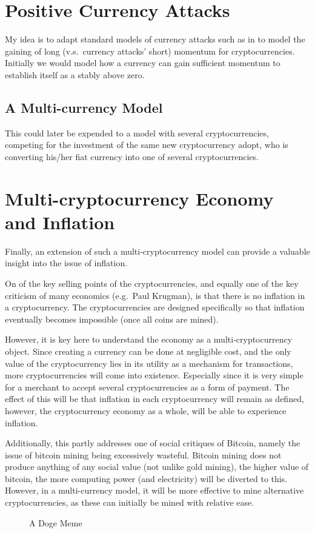 \begin{refsection}
\section{Positive Currency Attacks}
My idea is to adapt standard models of currency attacks such as in 
\textcite{obstfeld1986rational,obstfeld1995logic,obstfeld1996models}
to model the gaining of long (v.s.~currency attacks' short) momentum for cryptocurrencies.
Initially we would model how a currency can gain sufficient momentum to establish itself as a stably above zero.

\subsection{A Multi-currency Model}
This could later be expended to a model with several cryptocurrencies,
competing for the investment of the same new cryptocurrency adopt,
who is converting his/her fiat currency into one of several cryptocurrencies.

\section{Multi-cryptocurrency Economy and Inflation}
Finally, an extension of such a multi-cryptocurrency model can provide a valuable insight into the issue of inflation.

On of the key selling points of the cryptocurrencies, and equally one of the key criticism of many economics
(e.g.~Paul Krugman), is that there is no inflation in a cryptocurrency.
The cryptocurrencies are designed specifically so that inflation eventually becomes impossible (once all coins are mined).

However, it is key here to understand the economy as a multi-cryptocurrency object.
Since creating a currency can be done at negligible cost,
and the only value of the cryptocurrency lies in its utility as a mechanism for transactions,
more cryptocurrencies will come into existence.
Especially since it is very simple for a merchant to accept several cryptocurrencies as a form of payment.
The effect of this will be that inflation in each cryptocurrency will remain as defined,
however, the cryptocurrency economy as a whole, will be able to experience inflation.

Additionally, this partly addresses one of social critiques of Bitcoin,
namely the issue of bitcoin mining being excessively wasteful.
Bitcoin mining does not produce anything of any social value (not unlike gold mining),
the higher value of bitcoin, the more computing power (and electricity) will be diverted to this.
However, in a multi-currency model, it will be more effective to mine alternative cryptocurrencies,
as these can initially be mined with relative ease.


\begin{figure}
\caption{A Doge Meme}
\label{doge}
\end{figure}

\printbibliography
\end{refsection}
